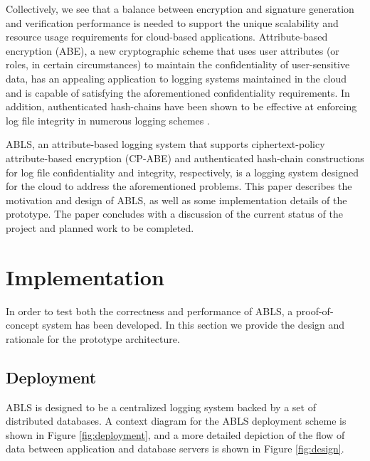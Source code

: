 \documentclass{sig-alternate}
\begin{document}
Collectively, we see that a balance between encryption and signature generation and verification performance is
needed to support the unique scalability and resource usage requirements for cloud-based applications.
Attribute-based encryption (ABE), a new cryptographic scheme that uses user attributes (or roles, in certain 
circumstances) to maintain the confidentiality of user-sensitive data, has an appealing application
to logging systems maintained in the cloud and is capable of satisfying the aforementioned confidentiality 
requirements. In addition, authenticated hash-chains have been shown to be effective at enforcing log file integrity
in numerous logging schemes  \cite{Schneier1999-Secure}. 

ABLS, an attribute-based logging system that supports 
ciphertext-policy attribute-based encryption (CP-ABE) 
\cite{Bethencourt2007-CPABE} and authenticated hash-chain constructions for log file confidentiality and integrity, 
respectively, is a logging system designed for the cloud to address the aforementioned problems. This paper
describes the motivation and design of ABLS, as well as some implementation details of the prototype. The paper
concludes with a discussion of the current status of the project and planned work to be completed.

\section{Implementation}
In order to test both the correctness and performance of ABLS, a proof-of-concept system has been
developed. In this section we provide the design and rationale for the prototype architecture.

\subsection{Deployment}
\label{sec:deployment}
ABLS is designed to be a centralized logging system backed by a set of distributed databases. A context
diagram for the ABLS deployment scheme is shown in Figure \ref{fig:deployment}, and a more detailed
depiction of the flow of data between application and database servers is shown in Figure \ref{fig:design}.


\end{document}
